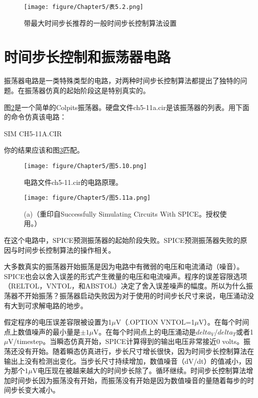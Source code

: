 \begin{figure}[htbp]
\small
    \centering
    \texttt{[image: figure/Chapter5/表5.2.png]}
    \caption{带最大时间步长推荐的一般时间步长控制算法设置}
    \label{表5.2}
\end{figure}

\section{时间步长控制和振荡器电路}
振荡器电路是一类特殊类型的电路，对两种时间步长控制算法都提出了独特的问题。在振荡器仿真的起始阶段这是特别真实的。

图\ref{图5.10}是一个简单的Colpits振荡器。硬盘文件ch5-11a.cir是该振荡器的列表。用下面的命令仿真该电路：

SIM CH5-11A.CIR

你的结果应该和图\ref{图5.11a}匹配。

\begin{figure}[htbp]
\small
    \centering
    \texttt{[image: figure/Chapter5/图5.10.png]}
    \caption{电路文件ch5-11.cir的电路原理。}
    \label{图5.10}
\end{figure}

\begin{figure}[htbp]
\small
    \centering
    \texttt{[image: figure/Chapter5/图5.11a.png]}
    \caption{(a)（重印自Successfully Simulating Circuits With SPICE。授权使用。）}
    \label{图5.11a}
\end{figure}

在这个电路中，SPICE预测振荡器的起始阶段失败。SPICE预测振荡器失败的原因与时间步长控制算法的操作相关。

大多数真实的振荡器开始振荡是因为电路中有微弱的电压和电流涌动（噪音）。SPICE也会以舍入误差的形式产生微量的电压和电流噪声。程序的误差容限选项（RELTOL，VNTOL，和ABSTOL）决定了舍入误差噪声的幅度。所以为什么振荡器不开始振荡？振荡器启动失败因为对于使用的时间步长尺寸来说，电压涌动没有大到可求解电路的地步。

假定程序的电压误差容限被设置为1$\mu$V（.OPTION VNTOL=1$\mu$V）。在每个时间点上数值噪声的最小量是$\pm 1\mu$V。在每个时间点上的电压涌动是$delta_V/delta_T$或者1$\mu$V/timestep。当瞬态仿真开始，SPICE计算得到的输出电压非常接近0 volts。振荡还没有开始。随着瞬态仿真进行，步长尺寸增长很快，因为时间步长控制算法在输出上没有检测出变化。当步长尺寸持续增加，数值噪音（dV/dt）的值减小，因为那个1$\mu$V电压现在被越来越大的时间步长除了。循环继续。时间步长控制算法增加时间步长因为振荡没有开始，而振荡没有开始是因为数值噪音的量随着每步的时间步长变大减小。

